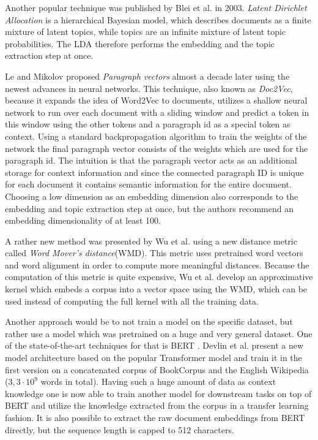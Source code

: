 Another popular technique was published by Blei et al. \cite{bleiLatentDirichletAllocation2003} in 2003. \textit{Latent Dirichlet Allocation} is a hierarchical Bayesian model, which describes documents as a finite mixture of latent topics, while topics are an infinite mixture of latent topic probabilities. The LDA therefore performs the embedding and the topic extraction step at once.

Le and Mikolov \cite{leDistributedRepresentationsSentences2014} proposed \textit{Paragraph vectors} almost a decade later using the newest advances in neural networks. This technique, also known as \textit{Doc2Vec}, because it expands the idea of Word2Vec \cite{mikolovDistributedRepresentationsWords} to documents, utilizes a shallow neural network to run over each document with a sliding window and predict a token in this window using the other tokens and a paragraph id as a special token as context. Using a standard backpropagation algorithm to train the weights of the network the final paragraph vector consists of the weights which are used for the paragraph id. The intuition is that the paragraph vector acts as an additional storage for context information and since the connected paragraph ID is unique for each document it contains semantic information for the entire document. Choosing a low dimension as an embedding dimension also corresponds to the embedding and topic extraction step at once, but the authors recommend an embedding dimensionality of at least 100.

A rather new method was presented by Wu et al. \cite{wuWordMoverEmbedding2018} using a new distance metric called \textit{Word Mover's distance}(WMD). This metric uses pretrained word vectors and word alignment in order to compute more meaningful distances. Because the computation of this metric is quite expensive, Wu et al. develop an approximative kernel which embeds a corpus into a vector space using the WMD, which can be used instead of computing the full kernel with all the training data.

Another approach would be to not train a model on the specific dataset, but rather use a model which was pretrained on a huge and very general dataset. One of the state-of-the-art techniques for that is BERT \cite{devlinBERTPretrainingDeep2018}. Devlin et al. present a new model architecture based on the popular Transformer model \cite{vaswaniAttentionAllYou2017} and train it in the first version on a concatenated corpus of BookCorpus and the English Wikipedia ($3,3\cdot 10^9$ words in total).  Having such a huge amount of data as context knowledge one is now able to train another model for downstream tasks on top of BERT and utilize the knowledge extracted from the corpus in a transfer learning fashion. It is also possible to extract the raw document embeddings from BERT directly, but the sequence length is capped to 512 characters.

